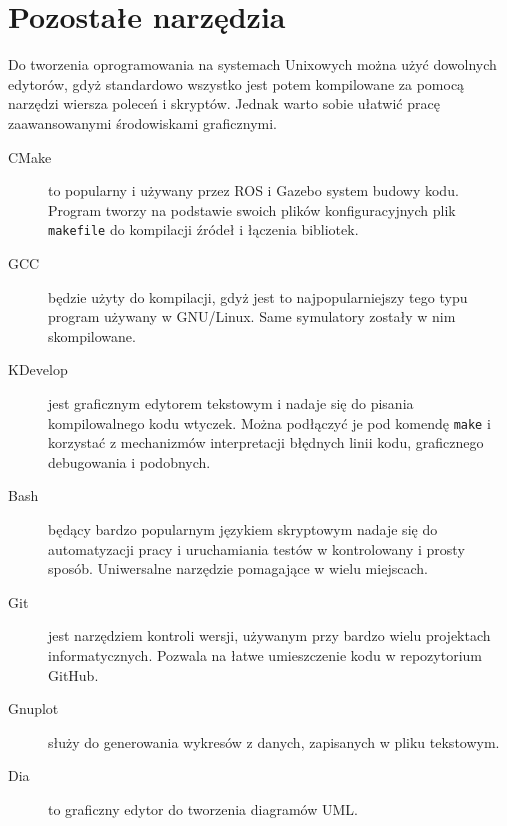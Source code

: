 \section{Pozostałe narzędzia}
	Do tworzenia oprogramowania na systemach Unixowych można użyć dowolnych edytorów, gdyż standardowo wszystko jest potem kompilowane za pomocą narzędzi wiersza poleceń i skryptów.
	Jednak warto sobie ułatwić pracę zaawansowanymi środowiskami graficznymi.
	\begin{description}
	\item[CMake] to popularny i używany przez ROS i Gazebo system budowy kodu. Program tworzy na podstawie swoich plików konfiguracyjnych plik \texttt{makefile} do kompilacji źródeł i łączenia bibliotek.
	\item[GCC] będzie użyty do kompilacji, gdyż jest to najpopularniejszy tego typu program używany w GNU/Linux. Same symulatory zostały w nim skompilowane.
	\item[KDevelop] jest graficznym edytorem tekstowym i nadaje się do pisania kompilowalnego kodu wtyczek. Można podłączyć je pod komendę \texttt{make} i korzystać z mechanizmów interpretacji błędnych linii kodu, graficznego debugowania i podobnych.
	\item[Bash] będący bardzo popularnym językiem skryptowym nadaje się do automatyzacji pracy i uruchamiania testów w kontrolowany i prosty sposób.
	Uniwersalne narzędzie pomagające w wielu miejscach.
	\item[Git] jest narzędziem kontroli wersji, używanym przy bardzo wielu projektach informatycznych. Pozwala na łatwe umieszczenie kodu w repozytorium GitHub.
	\item[Gnuplot] służy do generowania wykresów z danych, zapisanych w pliku tekstowym.
	\item[Dia] to graficzny edytor do tworzenia diagramów UML.
	\end{description}


